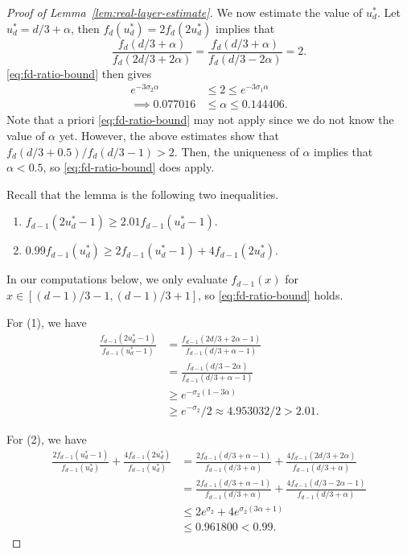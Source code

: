 \documentclass{article}
\theoremstyle{definition}
\begin{document}
\begin{proof}[Proof of Lemma~\ref{lem:real-layer-estimate}]
    We now estimate the value of $u_d^*$. Let $u_d^* = d/3 + \alpha$, then $f_d(u_d^*)=2f_d(2u_d^*)$ implies that
    \[\frac{f_d(d/3+\alpha)}{f_d(2d/3+2\alpha)} = \frac{f_d(d/3+\alpha)}{f_d(d/3-2\alpha)} = 2.\]
    \eqref{eq:fd-ratio-bound} then gives
    \begin{align*}
        e^{-3\sigma_2\alpha} &\leq 2\leq e^{-3\sigma_1\alpha}\\
        \implies 0.077016 &\leq \alpha \leq 0.144406.
    \end{align*}
    Note that a priori \eqref{eq:fd-ratio-bound} may not apply since we do not know the value of $\alpha$ yet. However, the above estimates show that $f_d(d/3+0.5)/f_d(d/3-1)>2$. Then, the uniqueness of $\alpha$ implies that $\alpha<0.5$, so \eqref{eq:fd-ratio-bound} does apply.

    Recall that the lemma is the following two inequalities.
    \begin{enumerate}
        \item $f_{d-1}(2u_d^*-1)\geq 2.01f_{d-1}(u_d^*-1).$
        \item $0.99f_{d-1}(u_d^*)\geq 2f_{d-1}(u_d^*-1)+4f_{d-1}(2u_d^*).$
    \end{enumerate}
    In our computations below, we only evaluate $f_{d-1}(x)$ for $x\in [(d-1)/3-1, (d-1)/3+1]$, so \eqref{eq:fd-ratio-bound} holds.

    For (1), we have
    \begin{align*}
        \frac{f_{d-1}(2u_d^*-1)}{f_{d-1}(u_d^*-1)} &= \frac{f_{d-1}(2d/3+2\alpha-1)}{f_{d-1}(d/3+\alpha-1)} \\
        &= \frac{f_{d-1}(d/3-2\alpha)}{f_{d-1}(d/3+\alpha-1)} \\
        &\geq e^{-\sigma_2(1-3\alpha)}\\
        &\geq e^{-\sigma_2}/2 \approx 4.953032/2 > 2.01.
    \end{align*}

    For (2), we have
    \begin{align*}
        \frac{2f_{d-1}(u_d^*-1)}{f_{d-1}(u_d^*)} + \frac{4f_{d-1}(2u_d^*)}{f_{d-1}(u_d^*)} &= \frac{2f_{d-1}(d/3+\alpha-1)}{f_{d-1}(d/3+\alpha)} + \frac{4f_{d-1}(2d/3+2\alpha)}{f_{d-1}(d/3+\alpha)} \\
        &= \frac{2f_{d-1}(d/3+\alpha-1)}{f_{d-1}(d/3+\alpha)} + \frac{4f_{d-1}(d/3-2\alpha-1)}{f_{d-1}(d/3+\alpha)} \\
        &\leq 2e^{\sigma_2}+4e^{\sigma_2(3\alpha+1)} \\
        &\leq 0.961800 < 0.99.
    \end{align*}

\end{proof}
\end{document}
